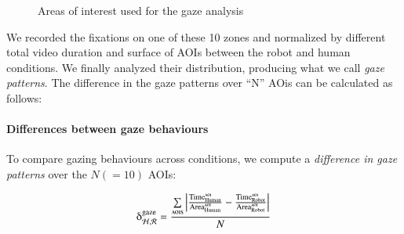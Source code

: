 \documentclass[lettersize, noapacite, twoside, HRI]{apa_HRI}
\begin{document}
\begin{figure}
    \centering

    \caption{Areas of interest used for the gaze analysis}
    \label{fig:aoi}
\end{figure}

We recorded the fixations on one of these 10 zones and normalized by different total video duration and surface of AOIs between the robot and human conditions. We finally analyzed their distribution, producing what we
call \emph{gaze patterns}. The difference in the gaze patterns over ``N'' AOis can be calculated as follows:\\




\paragraph{Differences between gaze behaviours}

To compare gazing behaviours across conditions, we compute a \emph{difference in
gaze patterns} over the $N(=10)$ AOIs:

{\large
\[
    \delta_{\mathcal{H}, \mathcal{R}}^{\text{gaze}} =
    \frac{\sum\limits_{{\text{{\sc aoi}s}}}\left |
    \frac{\text{Time}_{\text{Human}}^{\text{\sc
aoi}}}{\text{Area}_{\text{Human}}^{\text{\sc aoi}}} -
\frac{\text{Time}_{\text{Robot}}^{\text{\sc
aoi}}}{\text{Area}_{\text{Robot}}^{\text{\sc aoi}}} \right |}{N}
\]
}
\end{document}
